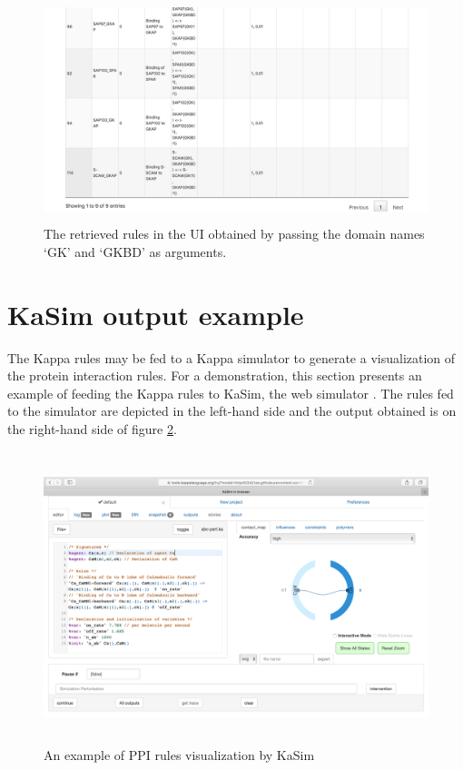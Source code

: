 \documentclass[msc,deptreport,ai]{infthesis}      %
\begin{document}
\begin{enumerate}
\begin{figure}[H]
		\captionsetup{justification=centering}
		\includegraphics[width=\linewidth,height=6.5cm,keepaspectratio]{CorrectnessDomainName2.png}	
		\caption{The retrieved rules in the UI obtained by passing the domain names `GK' and `GKBD' as arguments.}
		\label{fig:CorrectnessDomainName2}		
	\end{figure}	
\end{enumerate}

\section{KaSim output example}
The Kappa rules may be fed to a Kappa simulator to generate a visualization of the protein interaction rules. For a demonstration, this section presents an example of feeding the Kappa rules to KaSim, the web simulator \cite{KaSimBrowser}. The rules fed to the simulator are depicted in the left-hand side and the output obtained is on the right-hand side of figure \ref{fig:kappaOutput}. 
	\begin{figure}[H]
	\centering
	\captionsetup{justification=centering}
	\includegraphics[width=\linewidth,height=8.5cm,keepaspectratio]{KasimOutput}	
	\caption{An example of PPI rules visualization by KaSim \cite{KaSimBrowser}}
	\label{fig:kappaOutput}		
\end{figure}	
\end{document}
